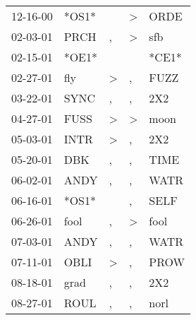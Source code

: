 \begin{supertabular}{p{0.07\textwidth}p{0.06\textwidth}p{0.02\textwidth}p{0.02\textwidth}p{0.06\textwidth}}
          12-16-00\textsuperscript{} &                            *OS1* &               &  \textgreater &          ORDE\textsuperscript{} \\
          02-03-01\textsuperscript{} &           PRCH\textsuperscript{} &             , &  \textgreater &           sfb\textsuperscript{} \\
          02-15-01\textsuperscript{} &                            *OE1* &               &               &                           *CE1* \\
          02-27-01\textsuperscript{} &            fly\textsuperscript{} &  \textgreater &             , &          FUZZ\textsuperscript{} \\
          03-22-01\textsuperscript{} &           SYNC\textsuperscript{} &             , &             , &           2X2\textsuperscript{} \\
          04-27-01\textsuperscript{} &           FUSS\textsuperscript{} &  \textgreater &  \textgreater &          moon\textsuperscript{} \\
          05-03-01\textsuperscript{} &           INTR\textsuperscript{} &  \textgreater &             , &           2X2\textsuperscript{} \\
          05-20-01\textsuperscript{} &            DBK\textsuperscript{} &             , &             , &          TIME\textsuperscript{} \\
          06-02-01\textsuperscript{} &           ANDY\textsuperscript{} &             , &             , &          WATR\textsuperscript{} \\
          06-16-01\textsuperscript{} &                            *OS1* &               &             , &          SELF\textsuperscript{} \\
          06-26-01\textsuperscript{} &           fool\textsuperscript{} &             , &  \textgreater &          fool\textsuperscript{} \\
          07-03-01\textsuperscript{} &           ANDY\textsuperscript{} &             , &             , &          WATR\textsuperscript{} \\
          07-11-01\textsuperscript{} &           OBLI\textsuperscript{} &  \textgreater &             , &          PROW\textsuperscript{} \\
          08-18-01\textsuperscript{} &           grad\textsuperscript{} &             , &             , &           2X2\textsuperscript{} \\
          08-27-01\textsuperscript{} &           ROUL\textsuperscript{} &             , &             , &          norl\textsuperscript{} \\

\end{supertabular}
